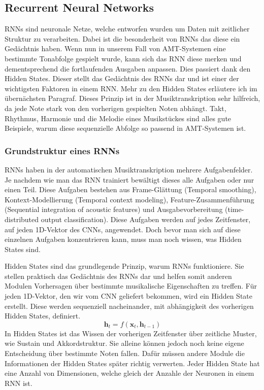 \subsection{Recurrent Neural Networks}
RNNs sind neuronale Netze, welche entworfen wurden um Daten mit zeitlicher Struktur zu verarbeiten.
Dabei ist die besonderheit von RNNs das diese ein Gedächtnis haben.
Wenn nun in unserem Fall von AMT-Systemen eine bestimmte Tonabfolge gespielt wurde,
kann sich das RNN diese merken und dementsprechend die fortlaufenden Ausgaben anpassen.
Dies passiert dank den Hidden States.
Dieser stellt das Gedächtnis des RNNs dar und ist einer der wichtigsten Faktoren in einem RNN\@.
Mehr zu den Hidden States erläutere ich im übernächsten Paragraf.
Dieses Prinzip ist in der Musiktranskription sehr hilfreich,
da jede Note stark von den vorherigen gespielten Noten abhängt.
Takt, Rhythmus, Harmonie und die Melodie eines Musikstückes sind alles gute Beispiele,
warum diese sequenzielle Abfolge so passend in AMT-Systemen ist.

\subsubsection{Grundstruktur eines RNNs}
RNNs haben in der automatischen Musiktranskription mehrere Aufgabenfelder.
Je nachdem wie man das RNN trainiert bewältigt dieses alle Aufgaben oder nur einen Teil.
Diese Aufgaben bestehen aus Frame-Glättung (Temporal smoothing), Kontext-Modellierung (Temporal context modeling),
Feature-Zusammenführung (Sequential integration of acoustic features)
und Ausgabevorbereitung (time-distributed output classification).
Diese Aufgaben werden auf jedes Zeitfenster, auf jeden 1D-Vektor des CNNs, angewendet.
Doch bevor man sich auf diese einzelnen Aufgaben konzentrieren kann, muss man noch wissen, was Hidden States sind.

Hidden States sind das grundlegende Prinzip, warum RNNs funktioniere.
Sie stellen praktisch das Gedächtnis des RNNs dar und helfen somit
anderen Modulen Vorhersagen über bestimmte musikalische Eigenschaften zu treffen.
Für jeden 1D-Vektor, den wir vom CNN geliefert bekommen, wird ein Hidden State erstellt.
Diese werden sequenziell nacheinander, mit abhängigkeit des vorherigen Hidden States, definiert.
\[
\mathbf{h}_t = f(\mathbf{x}_t, \mathbf{h}_{t-1})
\]
In Hidden States ist das Wissen der vorherigen Zeitfenster über zeitliche Muster, wie Sustain und Akkordstruktur.
Sie alleine können jedoch noch keine eigene Entscheidung über bestimmte Noten fallen.
Dafür müssen andere Module die Informationen der Hidden States später richtig verwerten.
Jeder Hidden State hat eine Anzahl von Dimensionen, welche gleich der Anzahle der Neuronen in einem RNN ist.

